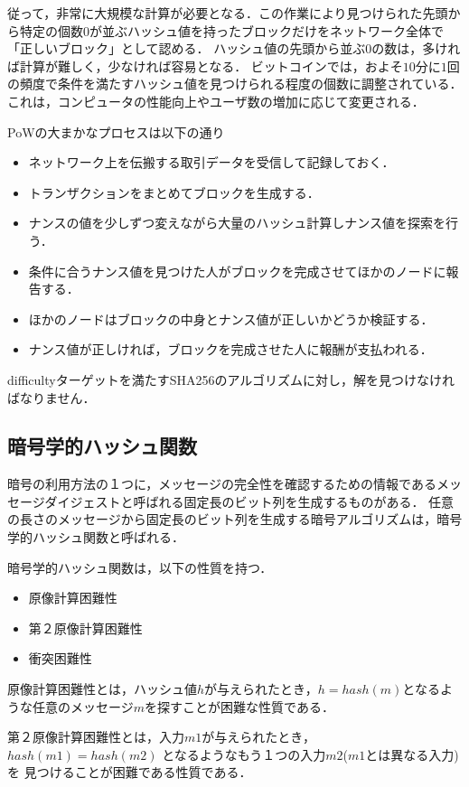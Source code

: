\documentclass[a4paper,12pt]{jsarticle}
\begin{document}
従って，非常に大規模な計算が必要となる．この作業により見つけられた先頭から特定の個数$0$が並ぶハッシュ値を持ったブロックだけをネットワーク全体で「正しいブロック」として認める．
ハッシュ値の先頭から並ぶ$0$の数は，多ければ計算が難しく，少なければ容易となる．
ビットコインでは，およそ$10$分に$1$回の頻度で条件を満たすハッシュ値を見つけられる程度の個数に調整されている．
これは，コンピュータの性能向上やユーザ数の増加に応じて変更される．


PoWの大まかなプロセスは以下の通り
\begin{itemize}
  \item ネットワーク上を伝搬する取引データを受信して記録しておく．
  \item トランザクションをまとめてブロックを生成する．
  \item ナンスの値を少しずつ変えながら大量のハッシュ計算しナンス値を探索を行う．
  \item 条件に合うナンス値を見つけた人がブロックを完成させてほかのノードに報告する．
  \item ほかのノードはブロックの中身とナンス値が正しいかどうか検証する．
  \item ナンス値が正しければ，ブロックを完成させた人に報酬が支払われる．
\end{itemize}

difficultyターゲットを満たすSHA256のアルゴリズムに対し，解を見つけなければなりません．

\subsection{暗号学的ハッシュ関数} %

暗号の利用方法の１つに，メッセージの完全性を確認するための情報であるメッセージダイジェストと呼ばれる固定長のビット列を生成するものがある．
任意の長さのメッセージから固定長のビット列を生成する暗号アルゴリズムは，暗号学的ハッシュ関数と呼ばれる．

暗号学的ハッシュ関数は，以下の性質を持つ．
\begin{itemize}
  \item 原像計算困難性
  \item 第２原像計算困難性
  \item 衝突困難性
\end{itemize}

原像計算困難性とは，ハッシュ値$h$が与えられたとき，$ h = hash(m)$となるような任意のメッセージ$m$を探すことが困難な性質である．

第２原像計算困難性とは，入力$m1$が与えられたとき，$ hash(m1) = hash(m2)$ となるようなもう１つの入力$m2$($m1$とは異なる入力)を
見つけることが困難である性質である．
\end{document}
